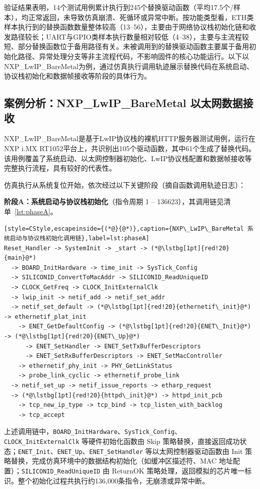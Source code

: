 验证结果表明，14个测试用例累计执行到245个替换驱动函数（平均17.5个/样本），均正常返回，未导致仿真崩溃、死循环或异常中断。按功能类型看，ETH类样本执行到的替换函数数量整体较高（13--56），主要由于网络协议栈初始化链和收发路径较长；UART与GPIO类样本执行数量相对较低（4--38），主要与主流程较短、部分替换函数位于备用路径有关。未被调用到的替换驱动函数主要属于备用初始化路径、异常处理分支等非主流程代码，不影响固件的核心功能运行。以下以NXP\_LwIP\_BareMetal为例，通过仿真执行调用轨迹展示替换代码在系统启动、协议栈初始化和数据帧接收等阶段的具体行为。

\subsection{案例分析：NXP\_LwIP\_BareMetal 以太网数据接收}

NXP\_LwIP\_BareMetal是基于LwIP协议栈的裸机HTTP服务器测试用例，运行在NXP i.MX RT1052平台上，共识别出105个驱动函数，其中61个生成了替换代码。该用例覆盖了系统启动、以太网控制器初始化、LwIP协议栈配置和数据帧接收等完整执行流程，具有较好的代表性。

仿真执行从系统复位开始，依次经过以下关键阶段（摘自函数调用轨迹日志）：

\textbf{阶段A：系统启动与协议栈初始化}（指令周期 1 -- 136623），其调用链见清单~\ref{lst:phaseA}。
\begin{lstlisting}[style=CStyle,escapeinside={(*@}{@*)},caption={NXP\_LwIP\_BareMetal 系统启动与协议栈初始化调用链},label=lst:phaseA]
Reset_Handler -> SystemInit -> _start -> (*@\lstbg[1pt]{red!20}{main}@*)
  -> BOARD_InitHardware -> time_init -> SysTick_Config
  -> SILICONID_ConvertToMacAddr -> SILICONID_ReadUniqueID
  -> CLOCK_GetFreq -> CLOCK_InitExternalClk
  -> lwip_init -> netif_add -> netif_set_addr
  -> netif_set_default -> (*@\lstbg[1pt]{red!20}{ethernetif\_init}@*) -> ethernetif_plat_init
    -> ENET_GetDefaultConfig -> (*@\lstbg[1pt]{red!20}{ENET\_Init}@*) -> (*@\lstbg[1pt]{red!20}{ENET\_Up}@*)
      -> ENET_SetHandler -> ENET_SetTxBufferDescriptors
      -> ENET_SetRxBufferDescriptors -> ENET_SetMacController
    -> ethernetif_phy_init -> PHY_GetLinkStatus
    -> probe_link_cyclic -> ethernetif_probe_link
  -> netif_set_up -> netif_issue_reports -> etharp_request
  -> (*@\lstbg[1pt]{red!20}{httpd\_init}@*) -> httpd_init_pcb
    -> tcp_new_ip_type -> tcp_bind -> tcp_listen_with_backlog
    -> tcp_accept
\end{lstlisting}

上述调用链中，\texttt{BOARD\_InitHardware}、\texttt{SysTick\_Config}、\texttt{CLOCK\_InitExternalClk} 等硬件初始化函数由 Skip 策略替换，直接返回成功状态；\texttt{ENET\_Init}、\texttt{ENET\_Up}、\texttt{ENET\_SetHandler} 等以太网控制器驱动函数由 Init 策略替换，完成仿真环境中的数据结构初始化（如缓冲区描述符、MAC 地址配置）；\texttt{SILICONID\_ReadUniqueID} 由 ReturnOK 策略处理，返回模拟的芯片唯一标识。整个初始化过程共执行约136,000条指令，无崩溃或异常中断。

